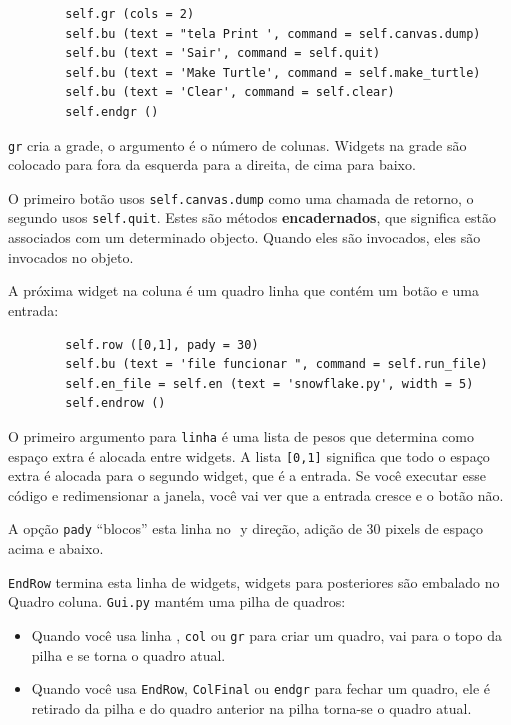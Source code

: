 \documentclass[10pt]{book}
\begin{document}
\begin{exercise}
\begin{v erbatim}
\begin{verbatim}
        self.gr (cols = 2)
        self.bu (text = "tela Print ', command = self.canvas.dump)
        self.bu (text = 'Sair', command = self.quit)
        self.bu (text = 'Make Turtle', command = self.make_turtle)
        self.bu (text = 'Clear', command = self.clear)
        self.endgr ()
\end{verbatim}
%
{\tt gr} cria a grade, o argumento é o número de
colunas. Widgets na grade são
colocado para fora da esquerda para a direita, de cima para baixo.

O primeiro botão usos {\tt self.canvas.dump} como uma chamada de retorno, o segundo
usos {\tt self.quit}. Estes são métodos {\bf encadernados}, que significa
estão associados com um determinado objecto. Quando eles são invocados, eles
são invocados no objeto.

A próxima widget na coluna é um quadro linha que contém
um botão e uma entrada:

\begin{verbatim}
        self.row ([0,1], pady = 30)
        self.bu (text = 'file funcionar ", command = self.run_file)
        self.en_file = self.en (text = 'snowflake.py', width = 5)
        self.endrow ()
\end{verbatim}
%
O primeiro argumento para {\tt linha} é uma lista de pesos que
determina como espaço extra é alocada entre widgets.  
A lista {\tt [0,1]} significa que todo o espaço extra é alocada
para o segundo widget, que é a entrada. Se você executar esse código
e redimensionar a janela, você vai ver que a entrada cresce e
o botão não.

A opção {\tt pady} ``blocos'' esta linha no $ $ y direção,
adição de 30 pixels de espaço acima e abaixo.

{\tt EndRow} termina esta linha de widgets, widgets para posteriores são
embalado no Quadro coluna. {\tt Gui.py} mantém uma pilha de quadros:

\begin{itemize}

\item Quando você usa {linha \tt}, {\tt col} ou {\tt gr} para criar um quadro,
vai para o topo da pilha e se torna o quadro atual.

\item Quando você usa {\tt EndRow}, {\tt ColFinal} ou {\tt endgr} para fechar
um quadro, ele é retirado da pilha e do quadro anterior na
pilha torna-se o quadro atual.


\end{itemize}
\end{v erbatim}
\end{exercise}
\end{document}
